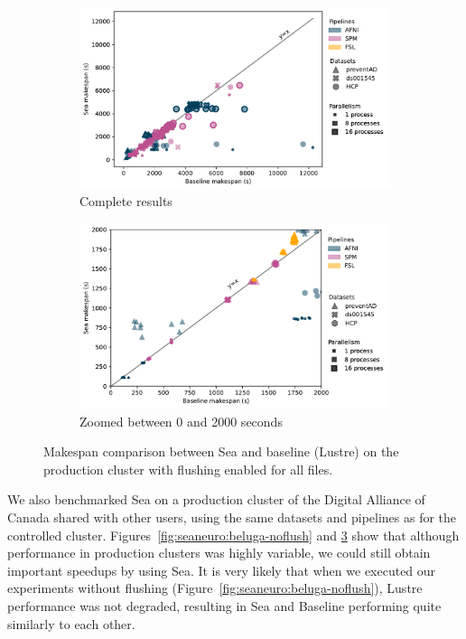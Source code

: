 \documentclass[pdflatex,sn-mathphys-num]{sn-jnl}
\theoremstyle{thmstyleone}%
\theoremstyle{thmstyletwo}%
\theoremstyle{thmstylethree}%
\begin{document}
\begin{figure}[t]
  \centering
\begin{subfigure}{\textwidth}
    \centering
    \captionsetup{width=\linewidth}
    \includegraphics[width=\columnwidth]{figures/beluga_withflush_nozoom_updated.pdf}%
    \caption{Complete results}\label{fig:seaneuro:belugafullwf}
\end{subfigure}
\begin{subfigure}{\textwidth}
    \centering
    \captionsetup{width=\textwidth}
    \includegraphics[width=\textwidth]{figures/beluga_withflush_zoom_updated.pdf}
    \caption{Zoomed between 0 and 2000 seconds}\label{fig:seaneuro:belugazoomwf}
\end{subfigure}
\caption{Makespan comparison between Sea and baseline (Lustre) on the production cluster with flushing enabled for all files.}
\label{fig:seaneuro:beluga-wflush}
\end{figure}

  We also benchmarked Sea on a production cluster of the Digital Alliance of Canada
  shared with other users,
  using the same datasets and pipelines as for the controlled cluster. 
  Figures~\ref{fig:seaneuro:beluga-noflush} and \ref{fig:seaneuro:beluga-wflush}
  show that although performance in production clusters was highly variable,
  we could still obtain important speedups by using Sea. It is very likely that when we
  executed our experiments without flushing
  (Figure~\ref{fig:seaneuro:beluga-noflush}), Lustre performance was not degraded, 
  resulting in Sea and Baseline performing
  quite similarly to each other.
  
\end{document}
